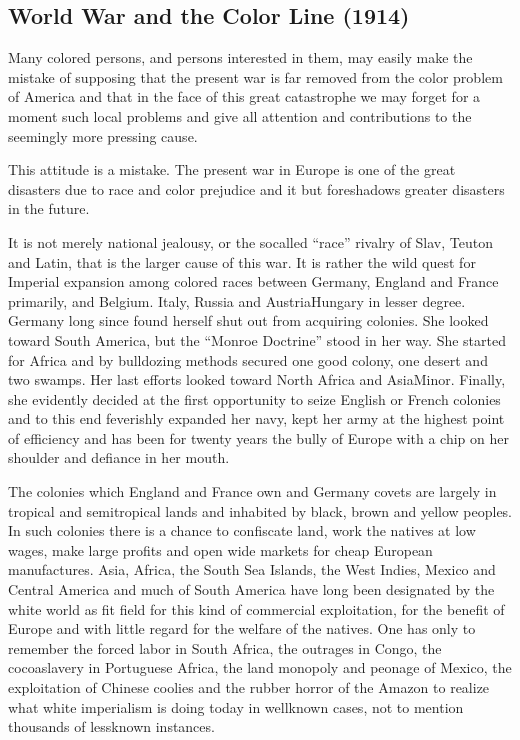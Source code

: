 \documentclass[letterpaper,10pt,english]{jupyterBook}
\begin{document}
\subsection{World War and the Color Line (1914)}
\label{\detokenize{Volumes/09/01/worldwar:world-war-and-the-color-line-1914}}\label{\detokenize{Volumes/09/01/worldwar::doc}}
\ignorespaces 
{}\ignorespaces 
\sphinxAtStartPar
Many colored persons, and persons interested in them, may easily make the mistake of supposing that the present war is far removed from the color problem of America and that in the face of this great catastrophe we may forget for a moment such local problems and give all attention and contributions to the seemingly more pressing cause.

\sphinxAtStartPar
This attitude is a mistake. The present war in Europe is one of the great disasters due to race and color prejudice and it but foreshadows greater disasters in the future.

\sphinxAtStartPar
It is not merely national jealousy, or the so\sphinxhyphen{}called “race” rivalry of Slav, Teuton and Latin, that is the larger cause of this war. It is rather the wild quest for Imperial expansion among colored races between Germany, England and France primarily, and Belgium. Italy, Russia and Austria\sphinxhyphen{}Hungary in lesser degree. Germany long since found herself shut out from acquiring colonies. She looked toward South America, but the “Monroe Doctrine” stood in her way. She started for Africa and by bulldozing methods secured one good colony, one desert and two swamps. Her last efforts looked toward North Africa and Asia\sphinxhyphen{}Minor. Finally, she evidently decided at the first opportunity to seize English or French colonies and to this end feverishly expanded her navy, kept her army at the highest point of efficiency and has been for twenty years the bully of Europe with a chip on her shoulder and defiance in her mouth.

\sphinxAtStartPar
The colonies which England and France own and Germany covets are largely in tropical and semi\sphinxhyphen{}tropical lands and inhabited by black, brown and yellow peoples. In such colonies there is a chance to confiscate land, work the natives at low wages, make large profits and open wide markets for cheap European manufactures. Asia, Africa, the South Sea Islands, the West Indies, Mexico and Central America and much of South America have long been designated by the white world as fit field for this kind of commercial exploitation, for the benefit of Europe and with little regard for the welfare of the natives. One has only to remember the forced labor in South Africa, the outrages in Congo, the cocoa\sphinxhyphen{}slavery in Portuguese Africa, the land monopoly and peonage of Mexico, the exploitation of Chinese coolies and the rubber horror of the Amazon to realize what white imperialism is doing to\sphinxhyphen{}day in well\sphinxhyphen{}known cases, not to mention thousands of less\sphinxhyphen{}known instances.
\end{document}
